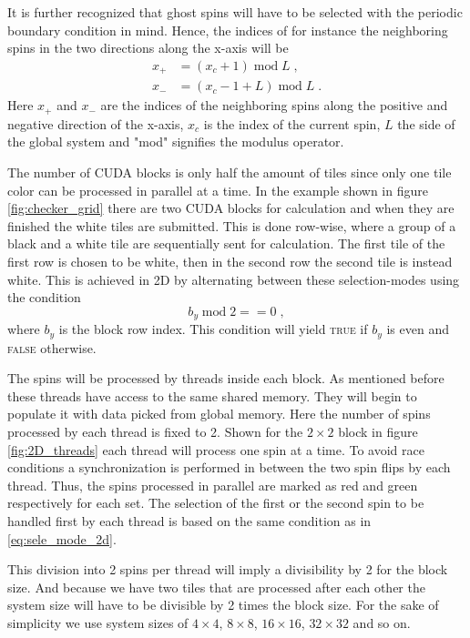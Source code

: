 \documentclass[paper=a4, fontsize=11pt]{scrartcl} %
\numberwithin{equation}{section} %
\numberwithin{figure}{section} %
\numberwithin{table}{section} %
\begin{document}
It is further recognized that ghost spins will have to be selected with the periodic boundary condition in mind. Hence, the indices of for instance the neighboring spins in the two directions along the x-axis will be
\begin{align*}
x_+&=(x_c+1)\; \text{mod} \; L \;, \\
x_-&=(x_c-1+L) \; \text{mod} \; L \;.
\end{align*}
Here $x_+$ and $x_-$ are the indices of the neighboring spins along the positive and negative direction of the x-axis, $x_c$ is the index of the current spin, $L$ the side of the global system and "mod" signifies the modulus operator.

The number of CUDA blocks is only half the amount of tiles since only one tile color can be processed in parallel at a time. In the example shown in figure \ref{fig:checker_grid} there are two CUDA blocks for calculation and when they are finished the white tiles are submitted. This is done row-wise, where a group of a black and a white tile are sequentially sent for calculation. The first tile of the first row is chosen to be white, then in the second row the second tile is instead white. This is achieved in 2D by alternating between these selection-modes using the condition 
\begin{equation}
b_y\; \text{mod} \; 2 == 0 \;,
\label{eq:sele_mode_2d}
\end{equation}
where $b_y$ is the block row index. This condition will yield \textsc{true} if $b_y$ is even and \textsc{false} otherwise.

The spins will be processed by threads inside each block. As mentioned before these threads have access to the same shared memory. They will begin to populate it with data picked from global memory. Here the number of spins processed by each thread is fixed to 2. Shown for the $2\times2$ block in figure \ref{fig:2D_threads} each thread will process one spin at a time. To avoid race conditions a synchronization is performed in between the two spin flips by each thread. Thus, the spins processed in parallel are marked as red and green respectively for each set. The selection of the first or the second spin to be handled first by each thread is based on the same condition as in \ref{eq:sele_mode_2d}.
 
This division into 2 spins per thread will imply a divisibility by 2 for the block size. And because we have two tiles that are processed after each other the system size will have to be divisible by 2 times the block size. For the sake of simplicity we use system sizes of $4\times4$, $8\times8$, $16\times16$, $32\times32$ and so on.
\end{document}
